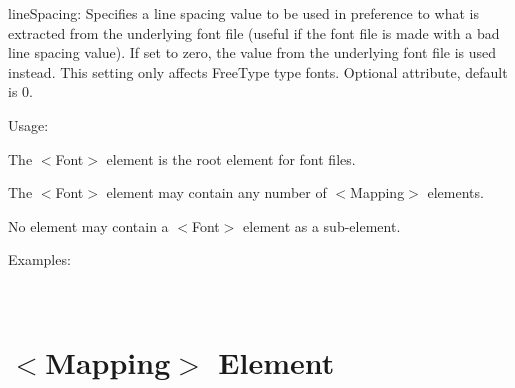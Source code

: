 \begin{DoxyItemize}
\begin{DoxyItemize}
\item {\ttfamily line\+Spacing\+:} Specifies a line spacing value to be used in preference to what is extracted from the underlying font file (useful if the font file is made with a bad line spacing value). If set to zero, the value from the underlying font file is used instead. This setting only affects Free\+Type type fonts. Optional attribute, default is 0.
\end{DoxyItemize}
\item Usage\+:
\begin{DoxyItemize}
\item The $<$Font$>$ element is the root element for font files.
\item The $<$Font$>$ element may contain any number of $<$Mapping$>$ elements.
\item No element may contain a $<$Font$>$ element as a sub-\/element.
\end{DoxyItemize}
\item Examples\+:
\end{DoxyItemize}

~\newline
 \hypertarget{xml_font_xml_font_mapping}{}\section{$<$\+Mapping$>$ Element}\label{xml_font_xml_font_mapping}

